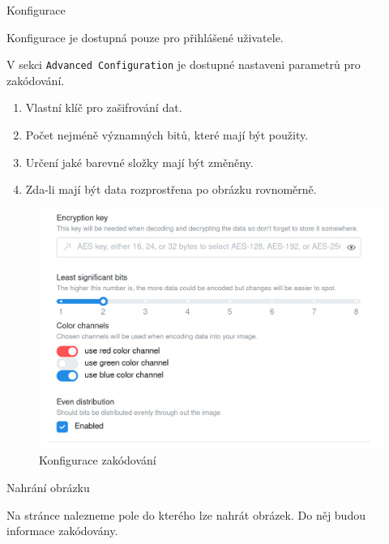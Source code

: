 \begin{subsubsection}{Konfigurace}\label{subsubsec:enc-konfigurace}

Konfigurace je dostupná pouze pro přihlášené uživatele.

V sekci \texttt{Advanced Configuration} je dostupné nastaveni parametrů
pro zakódování.

\begin{enumerate}
    \item Vlastní klíč pro zašifrování dat.
    \item Počet nejméně významných bitů, které mají být použity.
    \item Určení jaké barevné složky mají být změněny.
    \item Zda-li mají být data rozprostřena po obrázku rovnoměrně.
\end{enumerate}

\end{subsubsection}

\begin{figure}
    \centering
    \includegraphics[scale=0.5]{assets/images/encode-configuration}
    \caption{Konfigurace zakódování}\label{fig:konfigurace-zakodovani}
\end{figure}

\begin{subsubsection}{Nahrání obrázku}\label{subsubsec:enc-nahrani-obrazku}

Na stránce nalezneme pole do kterého lze nahrát obrázek.
Do něj budou informace zakódovány.

\end{subsubsection}

